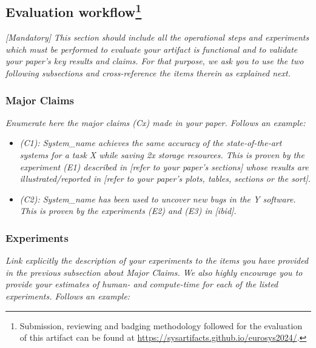 \subsection{Evaluation workflow\footnote{
Submission, reviewing and badging methodology followed for the evaluation of this artifact can be found at \url{https://sysartifacts.github.io/eurosys2024/}.}}
{\em [Mandatory]} \textit{This section should include all the operational steps and experiments which must be performed to evaluate your artifact is functional and to validate your paper's key results and claims. For that purpose, we ask you to use the two following subsections and cross-reference the items therein as explained next.}

\subsubsection{Major Claims}
\textit{Enumerate here the major claims (Cx) made in your paper. Follows an example:}\\

\begin{itemize}
    \item \textit{(C1): System\_name achieves the same accuracy of the state-of-the-art systems for a task X while saving 2x storage resources. This is proven by the experiment (E1) described in [refer to your paper's sections] whose results are illustrated/reported in [refer to your paper's plots, tables, sections or the sort].}
    \item \textit{(C2): System\_name has been used to uncover new bugs in the Y software. This is proven by the experiments (E2) and (E3) in [ibid].}
\end{itemize}

\subsubsection{Experiments}
\textit{Link explicitly the description of your experiments to the items you have provided in the previous subsection about Major Claims. We also highly encourage you to provide your estimates of human- and compute-time for each of the listed experiments. Follows an example:}
~\\


